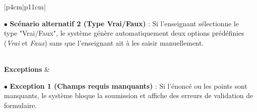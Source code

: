 \documentclass[12pt,a4paper]{report}
\begin{document}
\begin{table}[H]
\begin{tabular}{|p{4cm}|p{11cm}|}
\begin{minipage}[t]{\linewidth}
$\bullet$ \textbf{Scénario alternatif 2 (Type Vrai/Faux)} : Si l'enseignant sélectionne le type "Vrai/Faux", le système génère automatiquement deux options prédéfinies (\textit{Vrai} et \textit{Faux}) sans que l'enseignant ait à les saisir manuellement.
\vspace{0.1cm}
\end{minipage} \\
\hline
\textbf{Exceptions} & 
\begin{minipage}[t]{\linewidth}
$\bullet$ \textbf{Exception 1 (Champs requis manquants)} : Si l'énoncé ou les points sont manquants, le système bloque la soumission et affiche des erreurs de validation de formulaire.
\vspace{0.1cm}
\end{minipage} \\
\hline
\end{tabular}
\end{table}
\end{document}

